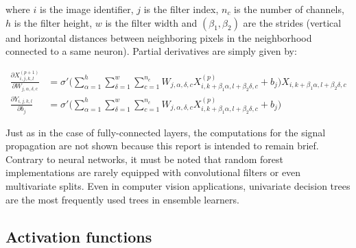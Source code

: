             where $i$ is the image identifier, $j$ is the filter index, $n_c$ is the number of channels, $h$ is the filter height, $w$ is the filter width
            and $(\beta_1, \beta_2)$ are the strides (vertical and horizontal distances between neighboring pixels in the neighborhood connected to a same neuron).
            Partial derivatives are simply given by:  %

        \begin{align}  %
            \frac{\partial X_{i, j, k, l}^{(p+1)}}{\partial W_{j, \alpha, \delta, c}} & =  %
                \sigma' \Big( \sum\limits_{\alpha=1}^h \sum\limits_{\delta=1}^w \sum\limits_{c=1}^{n_c} W_{j, \alpha, \delta, c}
                X_{i, k+\beta_1 \alpha, l+\beta_2 \delta, c}^{(p)} + b_{j} \Big) X_{i, k+\beta_1 \alpha, l+\beta_2 \delta, c} \\
            \frac{\partial Y_{i, j, k, l}}{\partial b_{j}} & =  %
                \sigma' \Big( \sum\limits_{\alpha=1}^h \sum\limits_{\delta=1}^w \sum\limits_{c=1}^{n_c} W_{j, \alpha, \delta, c}
                X_{i, k+\beta_1 \alpha, l+\beta_2 \delta, c}^{(p)} + b_{j} \Big)
        \end{align}

        Just as in the case of fully-connected layers, the computations for the signal propagation are not shown because this report is intended to remain brief.
        Contrary to neural networks, it must be noted that random forest implementations are rarely equipped with convolutional filters or even multivariate
        splits. Even in computer vision applications, univariate decision trees are the most frequently used trees in ensemble learners.


    \subsection{Activation functions}

